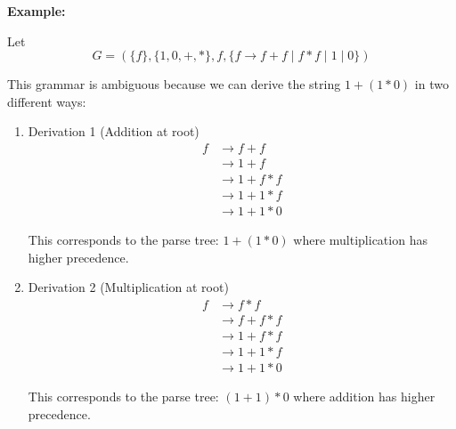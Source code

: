 \documentclass[12pt,a4paper,openany]{article}
\begin{document}
\textbf{Example:}

Let 
\[G = (\{f\}, \{1,0, +, *\}, f, \{f \to f + f \mid f*f \mid 1 \mid 0\})\]

This grammar is ambiguous because we can derive the string $1 + (1 * 0)$ in two different ways:
\begin{enumerate}

\item Derivation 1 (Addition at root)
\[
\begin{aligned}
f &\to f + f \\
  &\to 1 + f \\
  &\to 1 + f * f \\
  &\to 1 + 1 * f \\
  &\to 1 + 1 * 0
\end{aligned}
\]

This corresponds to the parse tree: $1 + (1 * 0)$ where multiplication has higher precedence.

\begin{center}
\end{center}


\item Derivation 2 (Multiplication at root)
\[
\begin{aligned}
f &\to f * f \\
  &\to f + f * f \\
  &\to 1 + f * f \\
  &\to 1 + 1 * f \\
  &\to 1 + 1 * 0
\end{aligned}
\]

This corresponds to the parse tree: $(1 + 1) * 0$ where addition has higher precedence.

\begin{center}
\end{center}

\end{enumerate}
\end{document}
